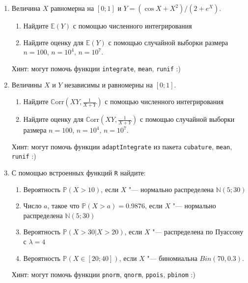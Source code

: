 \documentclass[10pt,a4paper]{article}
\newcommand{\E}{\mathbb{E}}
\renewcommand{\P}{\mathbb{P}}
\newcommand{\cN}{\mathbb{N}}
\newcommand{\Corr}{\mathbb{C}\mathrm{orr}}
\begin{document}
\pagestyle{fancy}

\fancyhf{}


\begin{enumerate}
\item Величина $X$ равномерна на $[0;1]$ и  $Y=(\cos X + X^2)/(2+e^X)$.
\begin{enumerate}
\item Найдите $\E(Y)$ с помощью численного интегрирования
\item Найдите оценку для $\E(Y)$ с помощью случайной выборки размера $n=100$, $n=10^4$, $n=10^7$.
\end{enumerate}

Хинт: могут помочь функции \verb|integrate|, \verb|mean|, \verb|runif| :)

\item Величины $X$ и $Y$ независимы и равномерны на $[0;1]$.
\begin{enumerate}
\item Найдите $\Corr \left(XY, \frac{1}{X+Y} \right)$ с помощью численного интегрирования
\item Найдите оценку для $\Corr\left(XY, \frac{1}{X+Y} \right)$ с помощью случайной выборки размера $n=100$, $n=10^4$, $n=10^7$.
\end{enumerate}

Хинт: могут помочь функции \verb|adaptIntegrate| из пакета \verb|cubature|, \verb|mean|, \verb|runif| :)

\item С помощью встроенных функций \verb|R| найдите:
\begin{enumerate}
\item Вероятность $\P(X>10)$, если $X$ "--- нормально распределена $\cN(5; 30)$
\item Число $a$, такое что $\P(X>a)=0.9876$, если $X$ "--- нормально распределена $\cN(5; 30)$
\item Вероятность $\P(X>30 | X>20)$, если $X$ "--- распределена по Пуассону с $\lambda = 4$
\item Вероятность $\P(X \in [20;40])$, если $X$ "--- биномиальна $Bin(70, 0.3)$.
\end{enumerate}

Хинт: могут помочь функции \verb|pnorm|, \verb|qnorm|, \verb|ppois|, \verb|pbinom| :)

\end{enumerate}
\end{document}
